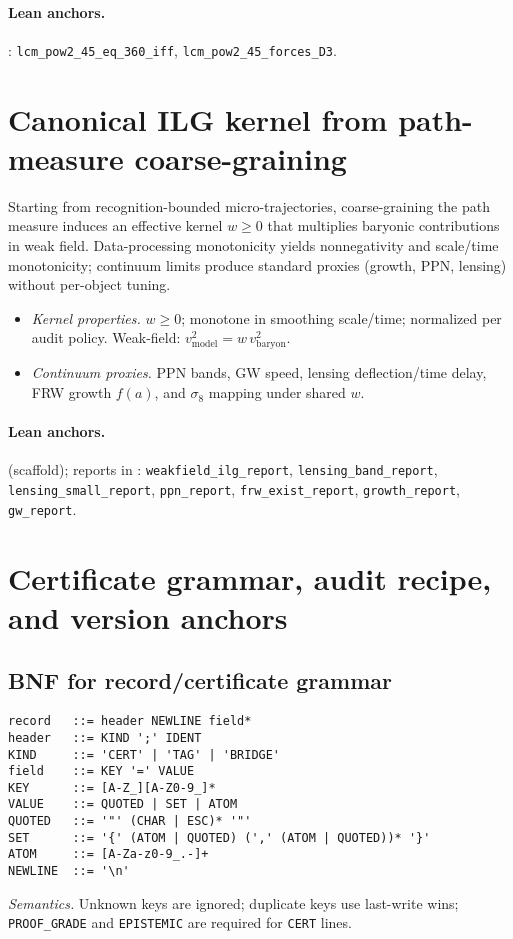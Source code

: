 \documentclass[11pt]{article}
\begin{document}
\paragraph{Lean anchors.} : \texttt{lcm\_pow2\_45\_eq\_360\_iff}, \texttt{lcm\_pow2\_45\_forces\_D3}.

\section{Canonical ILG kernel from path\mbox{-}measure coarse\mbox{-}graining}\label{app:ilg}
Starting from recognition\mbox{-}bounded micro\mbox{-}trajectories, coarse\mbox{-}graining the path measure induces an effective kernel \(w\ge 0\) that multiplies baryonic contributions in weak field. Data\mbox{-}processing monotonicity yields nonnegativity and scale/time monotonicity; continuum limits produce standard proxies (growth, PPN, lensing) without per\mbox{-}object tuning.
\begin{itemize}
  \item \emph{Kernel properties.} \(w\ge 0\); monotone in smoothing scale/time; normalized per audit policy. Weak\mbox{-}field: \(v^2_{\mathrm{model}}=w\,v^2_{\mathrm{baryon}}\).
  \item \emph{Continuum proxies.} PPN bands, GW speed, lensing deflection/time delay, FRW growth \(f(a)\), and \(\sigma_8\) mapping under shared \(w\).
\end{itemize}

\paragraph{Lean anchors.}  (scaffold); reports in : \texttt{weakfield\_ilg\_report}, \texttt{lensing\_band\_report}, \texttt{lensing\_small\_report}, \texttt{ppn\_report}, \texttt{frw\_exist\_report}, \texttt{growth\_report}, \texttt{gw\_report}.

\section{Certificate grammar, audit recipe, and version anchors}\label{app:certificates}
\subsection{BNF for record/certificate grammar}
\begin{verbatim}
record   ::= header NEWLINE field*
header   ::= KIND ';' IDENT
KIND     ::= 'CERT' | 'TAG' | 'BRIDGE'
field    ::= KEY '=' VALUE
KEY      ::= [A-Z_][A-Z0-9_]*
VALUE    ::= QUOTED | SET | ATOM
QUOTED   ::= '"' (CHAR | ESC)* '"'
SET      ::= '{' (ATOM | QUOTED) (',' (ATOM | QUOTED))* '}'
ATOM     ::= [A-Za-z0-9_.-]+
NEWLINE  ::= '\n'
\end{verbatim}
\emph{Semantics.} Unknown keys are ignored; duplicate keys use last\mbox{-}write wins; \texttt{PROOF\_GRADE} and \texttt{EPISTEMIC} are required for \texttt{CERT} lines.
\end{document}
